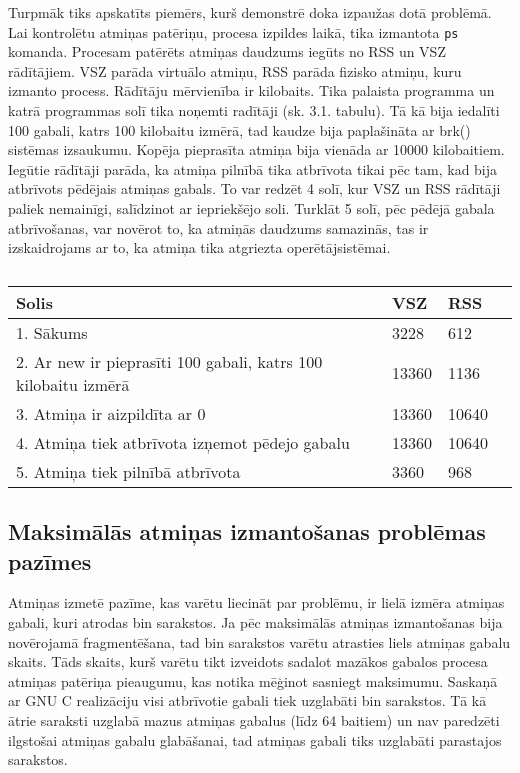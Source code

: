 Turpmāk tiks apskatīts piemērs, kurš demonstrē doka izpaužas dotā problēmā.
Lai kontrolētu atmiņas patēriņu, procesa izpildes laikā, tika izmantota \texttt{ps} komanda.
Procesam patērēts atmiņas daudzums iegūts no RSS un VSZ rādītājiem.
VSZ parāda virtuālo atmiņu, RSS parāda fizisko atmiņu, kuru izmanto process.
Rādītāju mērvienība ir kilobaits.
Tika palaista programma un katrā programmas solī tika noņemti radītāji (sk. 3.1. tabulu).
Tā kā bija iedalīti 100 gabali, katrs 100 kilobaitu izmērā, tad kaudze bija paplašināta ar brk() sistēmas izsaukumu.
Kopēja pieprasīta atmiņa bija vienāda ar 10000 kilobaitiem.
Iegūtie rādītāji parāda, ka atmiņa pilnībā tika atbrīvota tikai pēc tam, kad bija atbrīvots pēdējais atmiņas gabals.
To var redzēt 4 solī, kur VSZ un RSS rādītāji paliek nemainīgi, salīdzinot ar iepriekšējo soli.
Turklāt 5 solī, pēc pēdējā gabala atbrīvošanas, var novērot to, ka atmiņās daudzums samazinās, tas ir izskaidrojams ar to, ka atmiņa tika atgriezta operētājsistēmai. 


\begin{table}[H]
\caption{\textbf{\fontsize{11}{12}\selectfont {Programmas RSS un VSZ radītāji}}} 
\label{table:kysymys}
\centering
	\begin{tabular}{|l|l|l|p{5cm}|}
	  \hline
	Solis & VSZ & RSS \\
    \hline
    1. Sākums & 3228 & 612 \\
	\hline
	 2. Ar new ir pieprasīti 100 gabali, katrs 100 kilobaitu izmērā  & 13360  & 1136 \\
      \hline
     3. Atmiņa ir aizpildīta ar 0 &  13360 & 10640\\
      \hline
     4. Atmiņa tiek atbrīvota izņemot pēdejo gabalu & 13360 & 10640 \\
      \hline
     5. Atmiņa tiek pilnībā atbrīvota & 3360 & 968 \\
    \hline
	\end{tabular}
\end{table}

\subsection{Maksimālās atmiņas izmantošanas problēmas pazīmes}



Atmiņas izmetē pazīme, kas varētu liecināt par problēmu, ir lielā izmēra atmiņas gabali, kuri atrodas bin sarakstos.
Ja pēc maksimālās atmiņas izmantošanas bija novērojamā fragmentēšana, tad bin sarakstos varētu atrasties liels atmiņas gabalu skaits.
Tāds skaits, kurš varētu tikt izveidots sadalot mazākos gabalos procesa atmiņas patēriņa pieaugumu, kas notika mēģinot sasniegt maksimumu.
Saskaņā ar GNU C realizāciju visi atbrīvotie gabali tiek uzglabāti bin sarakstos. 
Tā kā ātrie saraksti uzglabā mazus atmiņas gabalus (līdz 64 baitiem) un nav paredzēti ilgstošai atmiņas gabalu glabāšanai, tad atmiņas gabali tiks uzglabāti parastajos sarakstos. 

